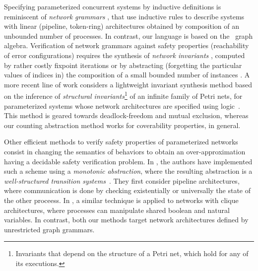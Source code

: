 Specifying parameterized concurrent systems by inductive definitions
is reminiscent of \emph{network grammars}
\cite{ShtadlerGrumberg89,LeMetayer,Hirsch}, that use inductive rules
to describe systems with linear (pipeline, token-ring) architectures
obtained by composition of an unbounded number of processes. In
contrast, our language is based on the \hrtext\ graph
algebra. Verification of network grammars against safety properties
(reachability of error configurations) requires the synthesis of
\emph{network invariants} \cite{WolperLovinfosse89}, computed by
rather costly fixpoint iterations \cite{LesensHalbwachsRaymond97} or
by abstracting (forgetting the particular values of indices in) the
composition of a small bounded number of instances
\cite{KestenPnueliShaharZuck02}. A more recent line of work considers
a lightweight invariant synthesis method based on the inference of
\emph{structural invariants}\footnote{Invariants that depend on the
  structure of a Petri net, which hold for any of its executions.} of
an infinite family of Petri nets, for parameterized systems whose
network architectures are specified using
logic~\cite{DBLP:conf/tacas/BozgaEISW20,DBLP:journals/tcs/BozgaIS23}. This
method is geared towards deadlock-freedom and mutual exclusion,
whereas our counting abstraction method works for coverability
properties, in general.

Other efficient methods to verify safety properties of parameterized
networks consist in changing the semantics of behaviors to obtain an
over-approximation having a decidable safety verification problem.  In
\cite{abdulla-monotonic-foundcs09}, the authors have implemented such
a scheme using a \emph{monotonic abstraction}, where the resulting
abstraction is a \emph{well-structured transition
  systems}~\cite{DBLP:conf/lics/AbdullaCJT96}.  They first consider
pipeline architectures, where communication is done by checking
existentially or universally the state of the other proceess.  In
\cite{abdulla-approximated.fmsd09}, a similar technique is applied to
networks with clique architectures, where processes can manipulate
shared boolean and natural variables. In contrast, both our methods
target network architectures defined by unrestricted \hrtext{} graph
grammars.
